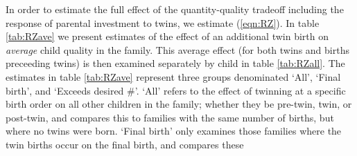 \documentclass{article}[11pt,subeqn]
\begin{document}
\begin{spacing}{1.5}
In order to estimate the full effect of the quantity-quality tradeoff including the response of parental investment to twins, we estimate 
(\ref{eqn:RZ}).  In table \ref{tab:RZave} we present estimates of the effect of an additional twin birth on \emph{average} child quality
in the family.  This average effect (for both twins and births preceeding twins) is then examined separately by child in table \ref{tab:RZall}.
The estimates in table \ref{tab:RZave} represent three groups denominated `All', `Final birth', and `Exceeds desired \#'.  `All' refers to the
effect of twinning at a specific birth order on all other children in the family; whether they be pre-twin, twin, or post-twin, and compares
this to families with the same number of births, but where no twins were born.  `Final birth' only examines those families where the twin births
occur on the final birth, and compares these 



\end{spacing}
\end{document}
